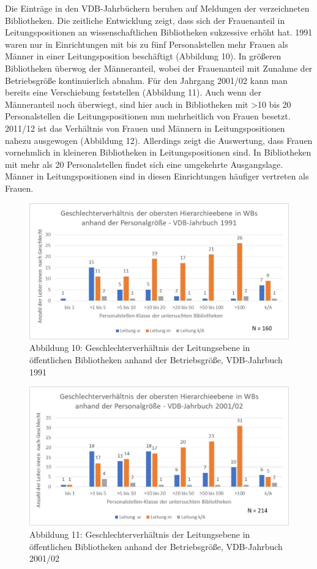 \documentclass[a4paper,
fontsize=11pt,
oneside,
numbers=noperiodatend,
parskip=half-,
bibliography=totoc,
final
]{scrartcl}
\begin{document}
Die Einträge in den VDB-Jahrbüchern beruhen auf Meldungen der
verzeichneten Bibliotheken. Die zeitliche Entwicklung zeigt, dass sich
der Frauenanteil in Leitungspositionen an wissenschaftlichen
Bibliotheken sukzessive erhöht hat. 1991 waren nur in Einrichtungen mit
bis zu fünf Personalstellen mehr Frauen als Männer in einer
Leitungsposition beschäftigt (Abbildung 10). In größeren Bibliotheken
überwog der Männeranteil, wobei der Frauenanteil mit Zunahme der
Betriebsgröße kontinuierlich abnahm. Für den Jahrgang 2001/02 kann man
bereits eine Verschiebung feststellen (Abbildung 11). Auch wenn der
Männeranteil noch überwiegt, sind hier auch in Bibliotheken mit
\textgreater10 bis 20 Personalstellen die Leitungspositionen nun
mehrheitlich von Frauen besetzt. 2011/12 ist das Verhältnis von Frauen
und Männern in Leitungspositionen nahezu ausgewogen (Abbildung 12).
Allerdings zeigt die Auswertung, dass Frauen vornehmlich in kleineren
Bibliotheken in Leitungspositionen sind. In Bibliotheken mit mehr als 20
Personalstellen findet sich eine umgekehrte Ausgangslage. Männer in
Leitungspositionen sind in diesen Einrichtungen häufiger vertreten als
Frauen.

\begin{figure}
\centering
\includegraphics{img/Abb.10_VDB-1991.jpg}
\caption{Abbildung 10: Geschlechterverhältnis der Leitungsebene in
öffentlichen Bibliotheken anhand der Betriebsgröße, VDB-Jahrbuch 1991}
\end{figure}

\begin{figure}
\centering
\includegraphics{img/Abb.11_VDB-2001.jpg}
\caption{Abbildung 11: Geschlechterverhältnis der Leitungsebene in
öffentlichen Bibliotheken anhand der Betriebsgröße, VDB-Jahrbuch
2001/02}
\end{figure}
\end{document}
